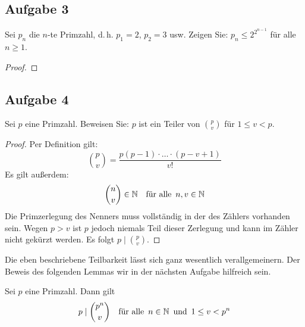 \subsection{Aufgabe 3}
Sei $p_n$ die $n$-te Primzahl, d.\,h. $p_1 = 2$, $p_2 = 3$ usw. Zeigen Sie:
$p_n \leq 2^{2^{n - 1}}$ für alle $n \geq 1$.
\begin{proof}
\end{proof}

\subsection{Aufgabe 4}
Sei $p$ eine Primzahl. Beweisen Sie: $p$ ist ein Teiler von $\binom{p}{v}$
für $1 \leq v < p$.
\begin{proof}
  Per Definition gilt:
  \begin{equation*}
    \binom{p}{v} = \frac{p(p-1) \cdot \ldots \cdot (p - v + 1)}{v!}
  \end{equation*}
  Es gilt außerdem:
  \begin{equation*}
    \binom{n}{v} \in \mathbb{N} \quad
    \text{für alle} \enspace n,v \in \mathbb{N}
  \end{equation*}
  Die Primzerlegung des Nenners muss
  vollständig in der des Zählers vorhanden sein.
  Wegen $p > v$ ist $p$ jedoch niemals Teil dieser Zerlegung und
  kann im Zähler nicht gekürzt werden.
  Es folgt $p \mid \binom{p}{v}$.
\end{proof}
\noindent
Die eben beschriebene Teilbarkeit lässt sich ganz wesentlich verallgemeinern.
Der Beweis des folgenden Lemmas wir in der nächsten Aufgabe hilfreich sein.
\begin{lemma}
  \label{lemma:p_divides_binom}
  Sei $p$ eine Primzahl. Dann gilt
  \begin{equation*}
    p \mid \binom{p^n}{v} \quad \text{für alle} \enspace n \in \mathbb{N}
    \enspace \text{und} \enspace 1 \leq v < p^n
  \end{equation*}
\end{lemma}

